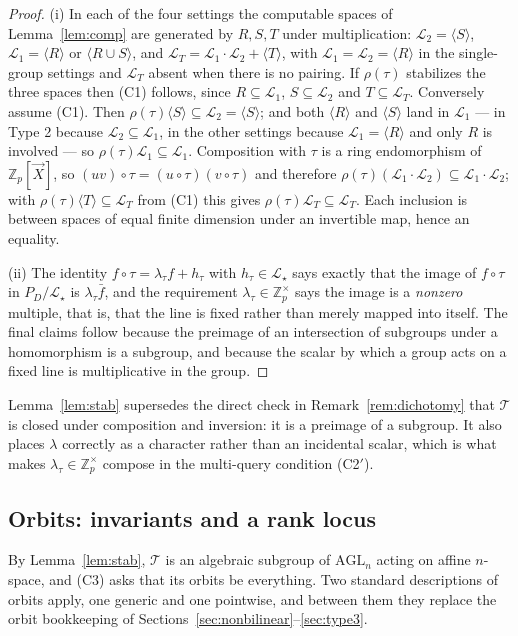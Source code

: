 \documentclass{aicr-solution}
\newcommand{\Zp}{\mathbb{Z}_p}
\newcommand{\Zpx}{\mathbb{Z}_p^{\times}}
\newcommand{\vX}{\vec{X}}
\newcommand{\LL}{\mathcal{L}}
\newcommand{\Span}[1]{\langle #1 \rangle} %
\newcommand{\AGL}{\mathrm{AGL}}
\begin{document}
\begin{proof}
(i) In each of the four settings the computable spaces of Lemma~\ref{lem:comp} are generated by
$R,S,T$ under multiplication: $\LL_2=\Span{S}$, $\LL_1=\Span{R}$ or $\Span{R\cup S}$, and
$\LL_T=\LL_1\cdot\LL_2+\Span{T}$, with $\LL_1=\LL_2=\Span{R}$ in the single-group settings and
$\LL_T$ absent when there is no pairing. If $\rho(\tau)$ stabilizes the three spaces then
\textup{(C1)} follows, since $R\subseteq\LL_1$, $S\subseteq\LL_2$ and $T\subseteq\LL_T$.
Conversely assume \textup{(C1)}. Then $\rho(\tau)\Span{S}\subseteq\LL_2=\Span{S}$; and both
$\Span{R}$ and $\Span{S}$ land in $\LL_1$ --- in Type 2 because $\LL_2\subseteq\LL_1$, in the
other settings because $\LL_1=\Span{R}$ and only $R$ is involved --- so
$\rho(\tau)\LL_1\subseteq\LL_1$. Composition with $\tau$ is a ring endomorphism of $\Zp[\vX]$,
so $(uv)\circ\tau=(u\circ\tau)(v\circ\tau)$ and therefore
$\rho(\tau)(\LL_1\cdot\LL_2)\subseteq\LL_1\cdot\LL_2$; with $\rho(\tau)\Span{T}\subseteq\LL_T$
from \textup{(C1)} this gives $\rho(\tau)\LL_T\subseteq\LL_T$. Each inclusion is between spaces
of equal finite dimension under an invertible map, hence an equality.

(ii) The identity $f\circ\tau=\lambda_\tau f+h_\tau$ with $h_\tau\in\LL_\star$ says exactly that
the image of $f\circ\tau$ in $P_D/\LL_\star$ is $\lambda_\tau\bar f$, and the requirement
$\lambda_\tau\in\Zpx$ says the image is a \emph{nonzero} multiple, that is, that the line is
fixed rather than merely mapped into itself. The final claims follow because the preimage of an
intersection of subgroups under a homomorphism is a subgroup, and because the scalar by which a
group acts on a fixed line is multiplicative in the group.
\end{proof}

Lemma~\ref{lem:stab} supersedes the direct check in Remark~\ref{rem:dichotomy} that
$\mathcal T$ is closed under composition and inversion: it is a preimage of a subgroup. It also
places $\lambda$ correctly as a character rather than an incidental scalar, which is what makes
$\lambda_\tau\in\Zpx$ compose in the multi-query condition \textup{(C2$'$)}.

\subsection{Orbits: invariants and a rank locus}

By Lemma~\ref{lem:stab}, $\mathcal T$ is an algebraic subgroup of $\AGL_n$ acting on affine
$n$-space, and \textup{(C3)} asks that its orbits be everything. Two standard descriptions of
orbits apply, one generic and one pointwise, and between them they replace the orbit
bookkeeping of Sections~\ref{sec:nonbilinear}--\ref{sec:type3}.
\end{document}
